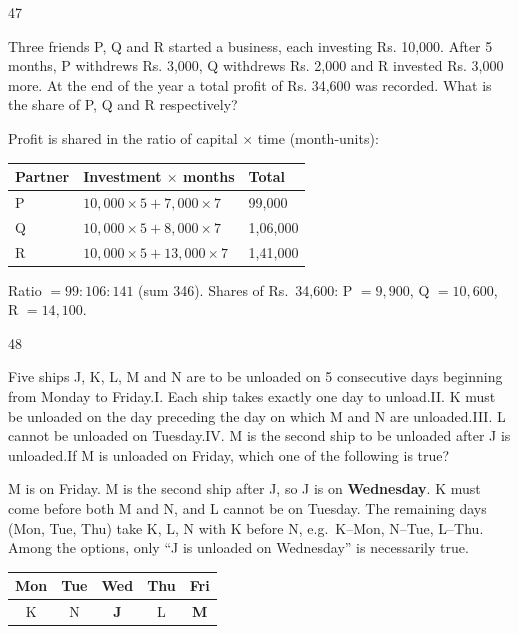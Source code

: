 \begin{question}{47}
{Three friends P, Q and R started a business, each investing Rs. 10,000. After 5 months, P withdrews Rs. 3,000, Q withdrews Rs. 2,000 and R invested Rs. 3,000 more. At the end of the year a total profit of Rs. 34,600 was recorded. What is the share of P, Q and R respectively?\par}
\begin{explain}
Profit is shared in the ratio of capital $\times$ time (month-units):
\begin{center}\small
\begin{tabular}{lll}\toprule
Partner & Investment $\times$ months & Total\\\midrule
P & $10{,}000\times5+7{,}000\times7$ & 99{,}000\\
Q & $10{,}000\times5+8{,}000\times7$ & 1{,}06{,}000\\
R & $10{,}000\times5+13{,}000\times7$ & 1{,}41{,}000\\\bottomrule
\end{tabular}
\end{center}
Ratio $=99:106:141$ (sum 346). Shares of Rs.~34{,}600: P $=9{,}900$, Q $=10{,}600$, R $=14{,}100$.
\end{explain}
\end{question}

\begin{question}{48}
{Five ships J, K, L, M and N are to be unloaded on 5 consecutive days beginning from Monday to Friday.\newline I. Each ship takes exactly one day to unload.\newline II. K must be unloaded on the day preceding the day on which M and N are unloaded.\newline III. L cannot be unloaded on Tuesday.\newline IV. M is the second ship to be unloaded after J is unloaded.\newline If M is unloaded on Friday, which one of the following is true?\par}
\begin{explain}
M is on Friday. M is the second ship after J, so J is on \textbf{Wednesday}. K must come before both M and N, and L cannot be on Tuesday. The remaining days (Mon, Tue, Thu) take K, L, N with K before N, e.g.\ K--Mon, N--Tue, L--Thu. Among the options, only ``J is unloaded on Wednesday'' is necessarily true.
\begin{center}\small
\begin{tabular}{ccccc}\toprule Mon & Tue & Wed & Thu & Fri\\\midrule K & N & \textbf{J} & L & \textbf{M}\\\bottomrule\end{tabular}
\end{center}
\end{explain}
\end{question}

